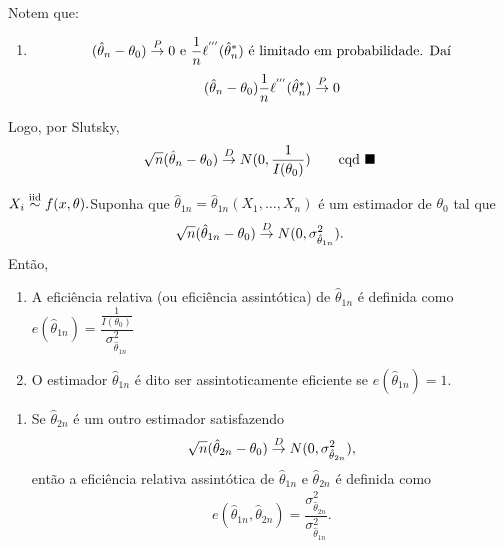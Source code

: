 \documentclass[12pt]{beamer}
\begin{document}
\begin{frame}{}
\begin{block}{Notem que:}
\justifying
\begin{enumerate}
\conti
    \item
\begin{align*}
    (\hat{\theta}_{n}-\theta_{0})\overset{P}{\rightarrow} 0~\text{e}~
    \dfrac{1}{n}\ell^{'''}(\hat{\theta}_{n}^{*})~\text{é limitado em probabilidade. Daí}
\end{align*}
\pause
\begin{align*}
    (\hat{\theta}_{n}-\theta_{0})\dfrac{1}{n}\ell^{'''}(\hat{\theta}_{n}^{*})\overset{P}{\rightarrow} 0
\end{align*}
\end{enumerate}
\end{block}
\pause
\begin{block}{}
\justifying
Logo, por Slutsky,
\begin{align*}
  \sqrt{n}(\hat{\theta}_{n}-\theta_{0})\overset{D}{\rightarrow} N(0,\dfrac{1}{I(\theta_{0})}) \qquad\text{cqd}~\blacksquare 
\end{align*}
\end{block}
\end{frame}

\begin{frame}{}
\begin{definicao}
\justifying
$X_{i}\overset{\text{iid}}{\sim} f(x,\theta).$Suponha que $\hat{\theta}_{1n}=\hat{\theta}_{1n}(X_{1},\ldots,X_{n})$ é um estimador de $\theta_{0}$ tal que 
\begin{align*}
  \sqrt{n}(\hat{\theta}_{1n}-\theta_{0})\overset{D}{\rightarrow} N(0,\sigma^{2}_{\hat{\theta}_{1n}}).
\end{align*}
Então,
\begin{enumerate}
    \item A eficiência relativa (ou eficiência assintótica) de $\hat{\theta}_{1n}$ é definida como $e(\hat{\theta}_{1n})=\dfrac{\frac{1}{I(\theta_{0})}}{\sigma_{\hat{\theta}_{1n}}^{2}}$
    \item O estimador $\hat{\theta}_{1n}$ é dito ser assintoticamente eficiente se $e(\hat{\theta}_{1n})=1.$
    \seti
\end{enumerate}
\end{definicao}
\end{frame}

\begin{frame}{}
\begin{block}{}
\justifying
\begin{enumerate}
\conti
\item Se $\hat{\theta}_{2n}$ é um outro estimador satisfazendo
\begin{align*}
    \sqrt{n}(\hat{\theta}_{2n}-\theta_{0})\overset{D}{\rightarrow} N(0,\sigma^{2}_{\hat{\theta}_{2n}}),
\end{align*}
então a eficiência relativa assintótica de $\hat{\theta}_{1n}$ e $\hat{\theta}_{2n}$ é definida como
\begin{align*}
e(\hat{\theta}_{1n},\hat{\theta}_{2n})=\dfrac{\sigma_{\hat{\theta}_{2n}}^{2}}{\sigma_{\hat{\theta}_{1n}}^{2}}.
\end{align*}
\end{enumerate}
\end{block}
\end{frame}
\end{document}
